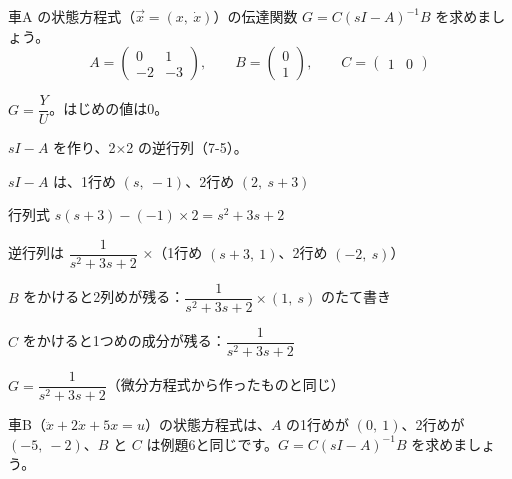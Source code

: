 \begin{reidai}[状態方程式から作る]
車A の状態方程式（$\vec x=(x,\ \dot x)$）の伝達関数 $G=C(sI-A)^{-1}B$ を求めましょう。
\[ A=\begin{pmatrix}0&1\\-2&-3\end{pmatrix},\qquad B=\begin{pmatrix}0\\1\end{pmatrix},\qquad C=\begin{pmatrix}1&0\end{pmatrix} \]
\kangaekata {}\par
{}\enspace $G=\dfrac{Y}{U}$。はじめの値は0。\par
{}\enspace $sI-A$ を作り、2×2 の逆行列（7-5）。\par
\shiki\kixis{}\zw{} $sI-A$ は、1行め $(s,\ -1)$、2行め $(2,\ s+3)$\par
\kixia 行列式 $s(s+3)-(-1)\times2=s^2+3s+2$\par
\kixia 逆行列は $\dfrac{1}{s^2+3s+2}$ ×（1行め $(s+3,\ 1)$、2行め $(-2,\ s)$）\par
\kixia $B$ をかけると2列めが残る：$\dfrac{1}{s^2+3s+2}\times(1,\ s)$ のたて書き\par
\kixia $C$ をかけると1つめの成分が残る：$\dfrac{1}{s^2+3s+2}$\par
\kotae $G=\dfrac{1}{s^2+3s+2}$（微分方程式から作ったものと同じ）
\end{reidai}

\begin{jibun}
車B（$\ddot x+2\dot x+5x=u$）の状態方程式は、$A$ の1行めが $(0,\ 1)$、2行めが $(-5,\ -2)$、$B$ と $C$ は例題6と同じです。$G=C(sI-A)^{-1}B$ を求めましょう。
\end{jibun}

